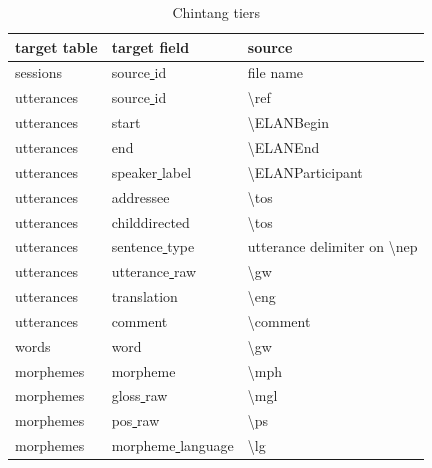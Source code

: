 \documentclass[a4paper, 11pt]{book}
\newcommand{\bks}{\textbackslash}	%
\newcommand{\und}{\underline{{ }}\hspace{0.2mm}}	%
\begin{document}
\begin{table}[ht!]
	\centering
	\begin{tabular}{lll}
		\toprule
			\textbf{target table} & \textbf{target field} & \textbf{source} \\
		\midrule 
			sessions 	& source\und id & file name \\
			utterances 	& source\und id		& \bks ref \\
			utterances 	& start					& \bks ELANBegin \\
			utterances 	& end					& \bks ELANEnd \\
			utterances 	& speaker\und label		& \bks ELANParticipant \\
			utterances 	& addressee				& \bks tos \\
			utterances 	& childdirected			& \bks tos \\
			utterances 	& sentence\und type		& utterance delimiter on \bks nep \\
			utterances 	& utterance\und raw		& \bks gw \\
			utterances 	& translation			& \bks eng \\
			utterances 	& comment				& \bks comment \\ %
			words	 	& word			& \bks gw \\
			morphemes	& morpheme				& \bks mph \\ %
			morphemes	& gloss\und raw			& \bks mgl \\ %
			morphemes	& pos\und raw			& \bks ps \\ %
			morphemes	& morpheme\und language	& \bks lg \\
		\bottomrule
	\end{tabular}
	\caption{Chintang tiers}
	\label{tab:Chintang tiers}
\end{table}
\end{document}
